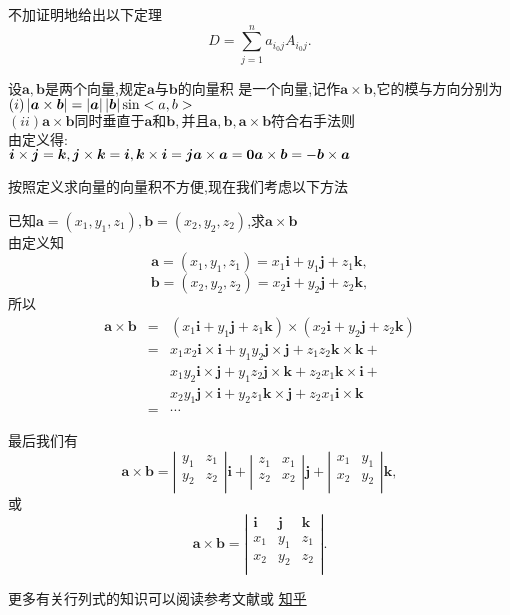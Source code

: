  不加证明地给出以下定理
$$
D=\sum_{j=1}^{n}a_{i_0j}A_{i_0j}.
$$

 设$\bm{a},\bm{b}$是两个向量,规定$\bm{a}$与$\bm{b}$的向量积
是一个向量,记作$\bm{a}\times\bm{b}$,它的模与方向分别为\\
$(i) \left| {\bm{a}\times\bm{b}} \right|=\left| {\bm{a}} \right|\left| {\bm{b}} \right|\sin<a,b>$\\
$(ii)\bm{a}\times\bm{b}\textbf{同时垂直于}\bm{a}\textbf{和}\bm{b},\textbf{并且}\bm{a},\bm{b},\bm{a}\times\bm{b}\textbf{符合右手法则}$\\
由定义得:\\
$\bm{i}\times\bm{j}=\bm{k},\bm{j}\times\bm{k}=\bm{i},\bm{k}\times\bm{i}=\bm{j}\\ 
\bm{a}\times\bm{a}=\bm{0} \\
\bm{a}\times\bm{b}=-\bm{b}\times\bm{a}
$


按照定义求向量的向量积不方便,现在我们考虑以下方法

\prob 已知$\bm{a}=(x_1,y_1,z_1),\bm{b}=(x_2,y_2,z_2)$,求$\bm{a}\times\bm{b}$\\
\sol
由定义知
$$\bm{a}=(x_1,y_1,z_1)
=x_1\bm{i}+y_1\bm{j}+z_1\bm{k},$$
$$\bm{b}=(x_2,y_2,z_2)=
x_2\bm{i}+y_2\bm{j}+z_2\bm{k},
$$
所以 
\begin{eqnarray}
  \bm{a}\times\bm{b}
  &=&(x_1\bm{i}+y_1\bm{j}+z_1\bm{k})\times(x_2\bm{i}+y_2\bm{j}+z_2\bm{k})\nonumber\\
  &=&x_1x_2\bm{i}\times\bm{i}+y_1y_2\bm{j}\times\bm{j}+z_1z_2\bm{k}\times\bm{k}+\nonumber\\
  &&x_1y_2\bm{i}\times\bm{j}+y_1z_2\bm{j}\times\bm{k}+z_2x_1\bm{k}\times\bm{i}+\nonumber\\
  &&x_2y_1\bm{j}\times\bm{i}+y_2z_1\bm{k}\times\bm{j}+z_2x_1\bm{i}\times\bm{k}\nonumber\\
  &=&\cdots\nonumber
\end{eqnarray}

最后我们有
$$
\bm{a}\times\bm{b}=
\left|
  \begin{array}{cc}
    y_1&z_1\\
    y_2&z_2\\
  \end{array}
\right|\bm{i}
+
\left|
  \begin{array}{cc}
    z_1&x_1\\
    z_2&x_2\\
  \end{array}
\right|\bm{j}
+
\left|
  \begin{array}{cc}
    x_1&y_1\\
    x_2&y_2\\
  \end{array}
\right|\bm{k},
$$
或
$$
\bm{a}\times\bm{b}=
\left|
  \begin{array}{ccc}
    \bm{i}&\bm{j}&\bm{k}\\
    x_1&y_1&z_1\\
    x_2&y_2&z_2\\
  \end{array}
\right|.
$$

更多有关行列式的知识可以阅读参考文献或
\href{https://www.zhihu.com/question/36966326}{知乎}